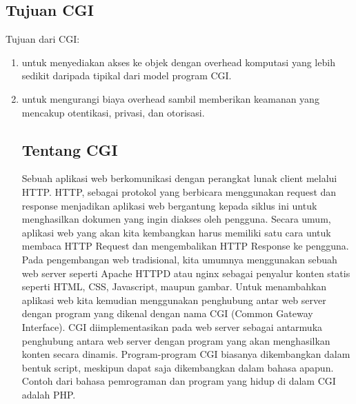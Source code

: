 \subsection{Tujuan CGI}
Tujuan dari CGI:
\begin{enumerate}
\item untuk menyediakan akses ke objek dengan overhead komputasi yang lebih sedikit daripada tipikal dari model program CGI.
\item untuk mengurangi biaya overhead sambil memberikan keamanan yang mencakup otentikasi, privasi, dan otorisasi.

\subsection{Tentang CGI}
Sebuah aplikasi web berkomunikasi dengan perangkat lunak client melalui HTTP. HTTP, sebagai protokol yang berbicara menggunakan request dan response menjadikan aplikasi web bergantung kepada siklus ini untuk menghasilkan dokumen yang ingin diakses oleh pengguna. Secara umum, aplikasi web yang akan kita kembangkan harus memiliki satu cara untuk membaca HTTP Request dan mengembalikan HTTP Response ke pengguna. 
	Pada pengembangan web tradisional, kita umumnya menggunakan sebuah web server seperti Apache HTTPD atau nginx sebagai penyalur konten statis seperti HTML, CSS, Javascript, maupun gambar. Untuk menambahkan aplikasi web kita kemudian menggunakan penghubung antar web server dengan program yang dikenal dengan nama CGI (Common Gateway Interface). 
	CGI diimplementasikan pada web server sebagai antarmuka penghubung antara web server dengan program yang akan menghasilkan konten secara dinamis. Program-program CGI biasanya dikembangkan dalam bentuk script, meskipun dapat saja dikembangkan dalam bahasa apapun. Contoh dari bahasa pemrograman dan program yang hidup di dalam CGI adalah PHP.


\end{enumerate}
